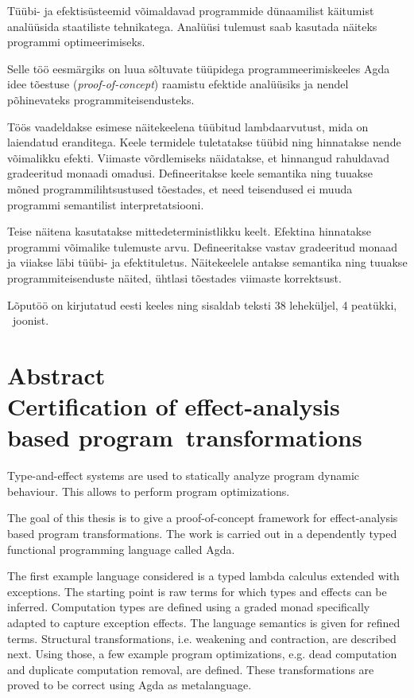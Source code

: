 \documentclass[a4paper,12pt]{article}
\begin{document}
Tüübi- ja efektisüsteemid võimaldavad programmide dünaamilist käitumist analüüsida staatiliste tehnikatega. Analüüsi tulemust saab kasutada näiteks programmi optimeerimiseks.

Selle töö eesmärgiks on luua sõltuvate tüüpidega programmeerimiskeeles Agda idee tõestuse (\emph{proof-of-concept}) raamistu efektide analüüsiks ja nendel põhinevateks programmiteisendusteks.

Töös vaadeldakse esimese näitekeelena tüübitud lambdaarvutust, mida on laiendatud eranditega.
Keele termidele tuletatakse tüübid ning hinnatakse nende võimalikku efekti.
Viimaste võrdlemiseks näidatakse, et hinnangud rahuldavad gradeeritud monaadi omadusi.
Defineeritakse keele semantika ning tuuakse mõned programmilihtsustused tõestades, et need teisendused ei muuda programmi semantilist interpretatsiooni.

Teise näitena kasutatakse mittedeterministlikku keelt.
Efektina hinnatakse programmi võimalike tulemuste arvu.
Defineeritakse vastav gradeeritud monaad ja viiakse läbi tüübi- ja efektituletus.
Näitekeelele antakse semantika ning tuuakse programmiteisenduste näited, ühtlasi tõestades viimaste korrektsust.


Lõputöö on kirjutatud eesti keeles ning sisaldab teksti 38 leheküljel, 4 peatükki, \totalfigures~joonist.
\clearpage\vspace*{0pt}

\section*{\centering Abstract\\
Certification of effect-analysis based program~transformations}

Type-and-effect systems are used to statically analyze program dynamic behaviour.
This allows to perform program optimizations.

The goal of this thesis is to give a proof-of-concept framework for effect-analysis based program transformations.
The work is carried out in a dependently typed functional programming language called Agda.

The first example language considered is a typed lambda calculus extended with exceptions.
The starting point is raw terms for which types and effects can be inferred.
Computation types are defined using a graded monad specifically adapted to capture exception effects.
The language semantics is given for refined terms.
Structural transformations, i.e. weakening and contraction, are described next.
Using those, a few example program optimizations, e.g. dead computation and duplicate computation removal, are defined.
These transformations are proved to be correct using Agda as metalanguage.
\end{document}
